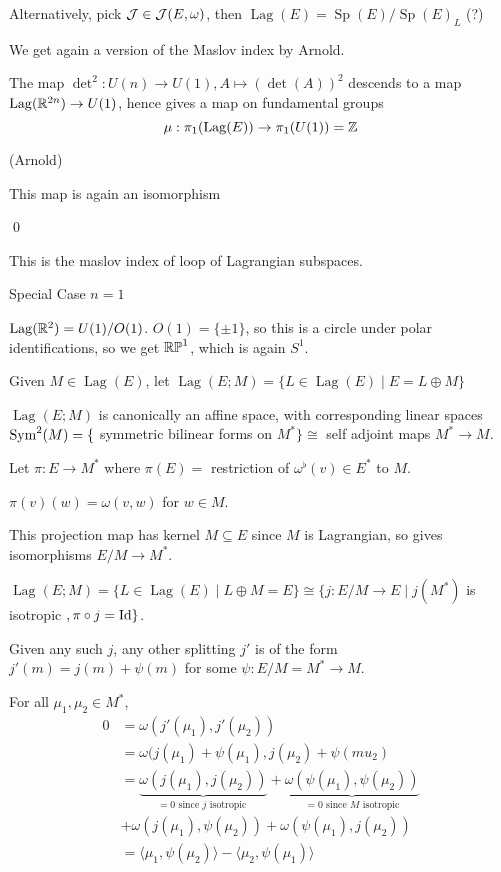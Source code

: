 \documentclass[x11names,reqno,14pt]{extarticle}
\newcommand{\jew}{\mc{J}(E,\omega)}
\DeclareMathOperator{\Sp}{Sp}
\DeclareMathOperator{\Lag}{Lag}
\begin{document}
Alternatively, pick $\mc{J}\in\jew$, then $\Lag(E) = \Sp(E) / \Sp(E)_L$ (?)

We get again a version of the Maslov index by Arnold. 

The map $\det^2:U(n) \to U(1), A \mapsto (\det(A))^2$ descends to a map $\Lag(\R^{2n}) \to U(1)$, hence gives a map on fundamental groups
\[
\mu:\pi_1(\Lag(E)) \to \pi_1(U(1)) = \Z
\]

\prop(Arnold)

This map is again an isomorphism

\proof

\qed

This is the maslov index of loop of Lagrangian subspaces.

Special Case $n = 1$

$\Lag(\R^2) = U(1)/O(1)$. $O(1) = \{\pm1\}$, so this is a circle under polar identifications, so we get ${\mathbb{RP}}^1$, which is again $S^1$. 

Given $M \in \Lag(E)$, let $\Lag(E; M) = \{L\in\Lag(E) \mid E = L\oplus M \}$

\prop $\Lag(E;M)$ is canonically an affine space, with corresponding linear spaces $\operatorname{\mathrm{Sym}}^2(M) = \{$ symmetric bilinear forms on $M^*\} \cong$ self adjoint maps $M^*\to M$. 

\proof

Let $\pi:E\to M^*$ where $\pi(E) = $ restriction of $\omega^\flat(v) \in E^*$ to $M$. 

$\pi(v)(w) = \omega(v,w)$ for $w\in M$. 

This projection map has kernel $M\subseteq E$ since $M$ is Lagrangian, so gives isomorphisms $E/M\to M^*$. 

$\Lag(E;M) = \{L \in \Lag(E) \mid L \oplus M = E\}\cong \{j:E/M \to E \mid j(M^*)$ is isotropic $, \pi\circ j= \operatorname{\mathrm{Id}}\}$. 

Given any such $j$, any other splitting $j'$ is of the form $j'(m) = j(m) + \psi(m)$ for some $\psi:E/M = M^*\to M$.

For all $\mu_1,\mu_2\in M^*$, 
\begin{align*}
0 & = \omega(j'(\mu_1),j'(\mu_2)) \\
& = \omega(j(\mu_1) + \psi(\mu_1), j(\mu_2) + \psi(mu_2) \\
& = \underbrace{\omega(j(\mu_1), j(\mu_2))}_{=0\text{ since $j$ isotropic }} + \underbrace{\omega(\psi(\mu_1),\psi(\mu_2))}_{=0\text{ since $M$ isotropic}} \\
& + \omega(j(\mu_1), \psi(\mu_2)) + \omega(\psi(\mu_1),j(\mu_2)) \\
& = \langle \mu_1, \psi(\mu_2)\rangle - \langle \mu_2, \psi(\mu_1) \rangle \\
\end{align*}
\end{document}
